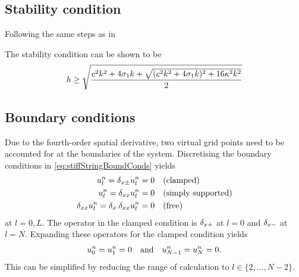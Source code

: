 \subsection{Stability condition}\label{sec:stiffStringStability}
Following the same steps as in 

The stability condition can be shown to be 
\begin{equation}
    h \geq \sqrt{\frac{c^2k^2+4\sigma_{1} k + \sqrt{(c^2k^2 + 4\sigma_{1} k)^2+16\kappa^2k^2}}{2}}
\end{equation}

\subsection{Boundary conditions}
Due to the fourth-order spatial derivative, two virtual grid points need to be accounted for at the boundaries of the system. Discretising the boundary conditions in \eqref{eq:stiffStringBoundConds} yields
\begin{subequations}\label{eq:stiffStringBoundCondsDisc}
    \begin{align}
        u_l^n = \delta_{x\pm} u_l^n &= 0 \quad \text{(clamped)}\label{eq:BCclampedDisc}\\
        u_l^n = \delta_{xx} u_l^n &= 0 \quad \text{(simply supported)}\label{eq:BCsimplySupportedDisc}\\
        \delta_{xx} u_l^n = \delta_{x\cdot}\delta_{xx} u_l^n &= 0 \quad \text{(free)}\label{eq:BCfreeDisc}
    \end{align}
\end{subequations}
at $l = 0, L$. The operator in the clamped condition is $\delta_{x+}$ at $l = 0$ and $\delta_{x-}$ at $l = N$. Expanding these operators for the clamped condition yields 
\begin{equation}
    u_0^n = u_1^n = 0 \quad \text{and} \quad u_{N-1}^n = u_N^n = 0.
\end{equation}
This can be simplified by reducing the range of calculation to $l\in \{ 2, \hdots, N-2\}$.

